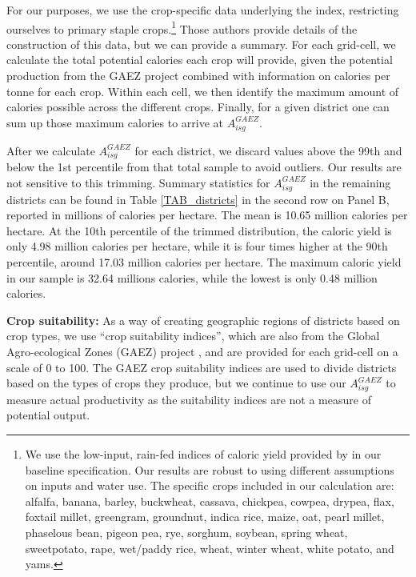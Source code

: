 \documentclass[11pt]{article}
\begin{document}
For our purposes, we use the crop-specific data underlying the \citet{galorozak2016} index, restricting ourselves to primary staple crops.\footnote{We use the low-input, rain-fed indices of caloric yield provided by \citet{galorozak2016} in our baseline specification. Our results are robust to using different assumptions on inputs and water use. The specific crops included in our calculation are: alfalfa, banana, barley, buckwheat, cassava, chickpea, cowpea, drypea, flax, foxtail millet, greengram, groundnut, indica rice, maize, oat, pearl millet, phaselous bean, pigeon pea, rye, sorghum, soybean, spring wheat, sweetpotato, rape, wet/paddy rice, wheat, winter wheat, white potato, and yams.} Those authors provide details of the construction of this data, but we can provide a summary. For each grid-cell, we calculate the total potential calories each crop will provide, given the potential production from the GAEZ project \citep{gaez} combined with information on calories per tonne for each crop. Within each cell, we then identify the maximum amount of calories possible across the different crops. Finally, for a given district one can sum up those maximum calories to arrive at $A^{GAEZ}_{isg}$.

After we calculate $A^{GAEZ}_{isg}$ for each district, we discard values above the 99th and below the 1st percentile from that total sample to avoid outliers. Our results are not sensitive to this trimming. Summary statistics for $A^{GAEZ}_{isg}$ in the remaining districts can be found in Table \ref{TAB_districts} in the second row on Panel B, reported in millions of calories per hectare. The mean is 10.65 million calories per hectare. At the 10th percentile of the trimmed distribution, the caloric yield is only 4.98 million calories per hectare, while it is four times higher at the 90th percentile, around 17.03 million calories per hectare. The maximum caloric yield in our sample is 32.64 millions calories, while the lowest is only 0.48 million calories. 

\vspace{.5cm}\noindent\textbf{Crop suitability:} As a way of creating geographic regions of districts based on crop types, we use ``crop suitability indices'', which are also from the Global Agro-ecological Zones (GAEZ) project \citep{gaez}, and are provided for each grid-cell on a scale of 0 to 100. The GAEZ crop suitability indices are used to divide districts based on the types of crops they produce, but we continue to use our $A^{GAEZ}_{isg}$ to measure actual productivity as the suitability indices are not a measure of potential output.
\end{document}
